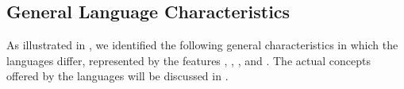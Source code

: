 




	
\subsection{General Language Characteristics}\label{sec:langcharacteristics}
As illustrated in , we identified the following general characteristics in which the languages differ, represented by the features \fnotation, \fsemantics, \flangparadigm, and \fextensibility. The actual concepts offered by the languages will be discussed in .

